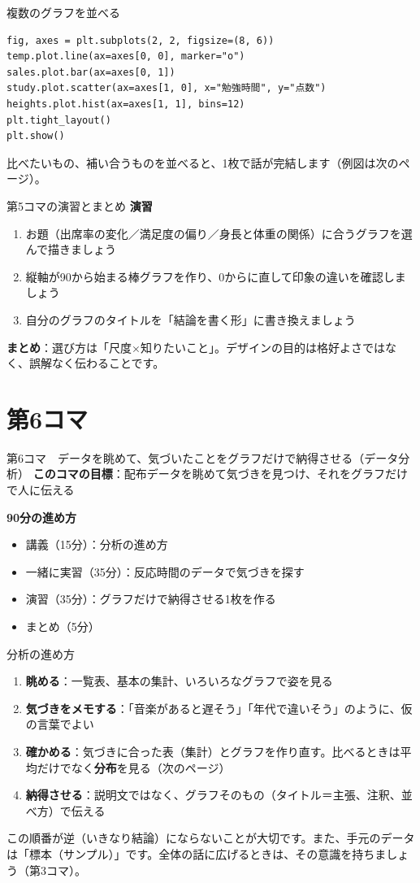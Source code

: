 \documentclass[aspectratio=169,11pt]{beamer}
\newcommand{\sess}[3]{%
\begin{frame}{#1}
\textbf{このコマの目標}：#2

\vspace{0.6em}
\textbf{90分の進め方}
\begin{itemize}
#3
\end{itemize}
\end{frame}}
\begin{document}
\begin{frame}[fragile]{複数のグラフを並べる}
\begin{lstlisting}
fig, axes = plt.subplots(2, 2, figsize=(8, 6))
temp.plot.line(ax=axes[0, 0], marker="o")
sales.plot.bar(ax=axes[0, 1])
study.plot.scatter(ax=axes[1, 0], x="勉強時間", y="点数")
heights.plot.hist(ax=axes[1, 1], bins=12)
plt.tight_layout()
plt.show()
\end{lstlisting}
比べたいもの、補い合うものを並べると、1枚で話が完結します（例図は次のページ）。
\end{frame}

\begin{frame}{第5コマの演習とまとめ}
\textbf{演習}
\begin{enumerate}
\item お題（出席率の変化／満足度の偏り／身長と体重の関係）に合うグラフを選んで描きましょう
\item 縦軸が90から始まる棒グラフを作り、0からに直して印象の違いを確認しましょう
\item 自分のグラフのタイトルを「結論を書く形」に書き換えましょう
\end{enumerate}
\vspace{0.5em}
\textbf{まとめ}：選び方は「尺度×知りたいこと」。デザインの目的は格好よさではなく、誤解なく伝わることです。
\end{frame}

\section{第6コマ}
\sess{第6コマ　データを眺めて、気づいたことをグラフだけで納得させる（データ分析）}{配布データを眺めて気づきを見つけ、それをグラフだけで人に伝える}
{\item 講義（15分）：分析の進め方
\item 一緒に実習（35分）：反応時間のデータで気づきを探す
\item 演習（35分）：グラフだけで納得させる1枚を作る
\item まとめ（5分）}

\begin{frame}{分析の進め方}
\begin{enumerate}
\item \textbf{眺める}：一覧表、基本の集計、いろいろなグラフで姿を見る
\item \textbf{気づきをメモする}：「音楽があると遅そう」「年代で違いそう」のように、仮の言葉でよい
\item \textbf{確かめる}：気づきに合った表（集計）とグラフを作り直す。比べるときは平均だけでなく\textbf{分布}を見る（次のページ）
\item \textbf{納得させる}：説明文ではなく、グラフそのもの（タイトル＝主張、注釈、並べ方）で伝える
\end{enumerate}
\vspace{0.5em}
この順番が逆（いきなり結論）にならないことが大切です。また、手元のデータは「標本（サンプル）」です。全体の話に広げるときは、その意識を持ちましょう（第3コマ）。
\end{frame}
\end{document}
